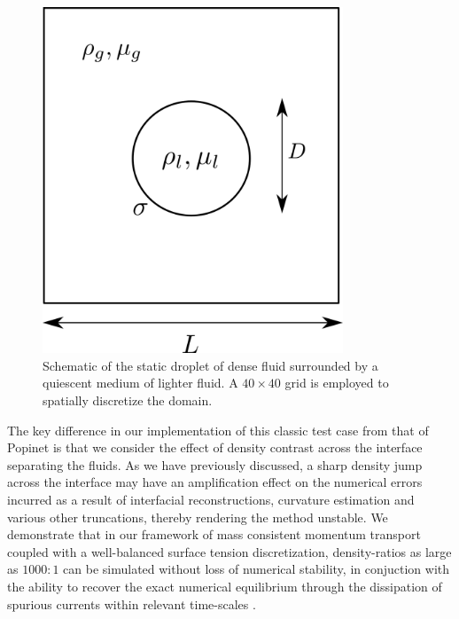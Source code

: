 \begin{figure}[h!]
    \centering
    \includegraphics[width = 0.8\textwidth]{plots/static_drop/config.png}
    \caption{Schematic of the static droplet of dense fluid surrounded by a quiescent medium of lighter fluid. A $40 \times 40$ grid is employed to spatially discretize the domain.}
    \label{static_conf}
\end{figure}

The key difference in our implementation of this classic test case from that of Popinet  is that we consider the effect of density contrast across the interface separating the fluids. As we have previously discussed, a sharp density jump across the interface may have an amplification effect on the numerical errors incurred as a result of interfacial reconstructions, curvature estimation and various other truncations, thereby rendering the method unstable. We demonstrate that in our framework of mass consistent momentum transport coupled with a well-balanced surface tension discretization, density-ratios as large as $1000:1$ can be simulated without loss of numerical stability, in conjuction with the ability to recover the exact numerical equilibrium through the dissipation of spurious currents within relevant time-scales .

